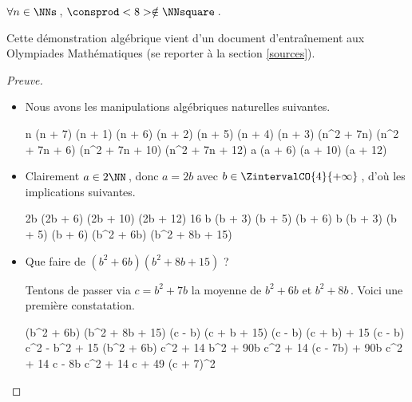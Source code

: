 \begin{fact} \label{case-8}
	 $\forall n \in \NNs$\,, $\consprod<8> \notin \NNsquare$\,.
\end{fact}




Cette démonstration algébrique vient d'un document d'entraînement aux Olympiades Mathématiques (se reporter à la section \ref{sources}).


\begin{proof}[Preuve]
	\leavevmode

    \begin{itemize}
    	\item Nous avons les manipulations algébriques naturelles suivantes.
    
        \medskip
        \noindent\kern-6pt%
        \begin{stepcalc}[style = sar]
        \explnext{}
        	n (n + 7) \cdot (n + 1) (n + 6) \cdot (n + 2) (n + 5) \cdot (n + 4) (n + 3) 
        \explnext{}
        	(n^2 + 7n) (n^2 + 7n + 6) (n^2 + 7n + 10) (n^2 + 7n + 12) 
        	a (a + 6) (a + 10) (a + 12)
        \end{stepcalc}
    
    
    	\item Clairement $a \in 2 \NN$\,, donc $a = 2b$ avec $b \in \ZintervalCO{4}{+\infty}$\,, d'où les implications suivantes.
    
        \medskip
        \noindent\kern-10pt%
        \begin{stepcalc}[style = ar*, ope=\implies]
        	 \in \NNssquare
        \explnext{}
        	2b (2b + 6) (2b + 10) (2b + 12) \in \NNssquare
        \explnext{}
        	16 b (b + 3) (b + 5) (b + 6) \in \NNssquare
        	b (b + 3) (b + 5) (b + 6) \in \NNssquare
        	(b^2 + 6b) (b^2 + 8b + 15) \in \NNssquare
        \end{stepcalc}
    
    
    	\item Que faire de $(b^2 + 6b) (b^2 + 8b + 15)$ ?
    
        \smallskip
        \noindent%
        Tentons de passer via $c = b^2 + 7b$ la moyenne de $b^2 + 6b$ et $b^2 + 8b$\,. Voici une première constatation.
    
        \medskip
        \noindent\kern-10pt%
        \begin{stepcalc}[style = ar*]
        	(b^2 + 6b) (b^2 + 8b + 15)
        \explnext{}
        	(c - b) (c + b + 15)
        \explnext{}
        	(c - b) (c + b) + 15 (c - b)
        \explnext{}
        	c^2 - b^2 + 15 (b^2 + 6b)
        \explnext{}
        	c^2 + 14 b^2 + 90b
        \explnext{}
        	c^2 + 14 (c - 7b) + 90b
        \explnext{}
        	c^2 + 14 c - 8b
        \explnext[<]{}
        	c^2 + 14 c + 49
        \explnext[<]{}
        	(c + 7)^2
        \end{stepcalc}
        

\end{itemize}
\end{proof}
